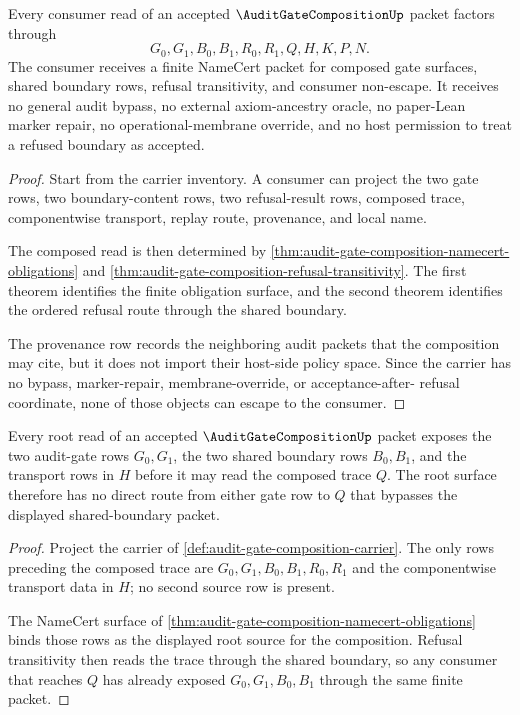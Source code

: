 \begin{theorem}
\label{thm:audit-gate-composition-consumer-nonescape}
Every consumer read of an accepted $\AuditGateCompositionUp$ packet factors
through
$$
G_0,G_1,B_0,B_1,R_0,R_1,Q,H,K,P,N.
$$
The consumer receives a finite NameCert packet for composed gate surfaces,
shared boundary rows, refusal transitivity, and consumer non-escape. It
receives no general audit bypass, no external axiom-ancestry oracle, no
paper-Lean marker repair, no operational-membrane override, and no host
permission to treat a refused boundary as accepted.
\end{theorem}
\begin{proof}
Start from the carrier inventory. A consumer can project the two gate rows,
two boundary-content rows, two refusal-result rows, composed trace,
componentwise transport, replay route, provenance, and local name.

The composed read is then determined by
\autoref{thm:audit-gate-composition-namecert-obligations} and
\autoref{thm:audit-gate-composition-refusal-transitivity}. The first theorem
identifies the finite obligation surface, and the second theorem identifies
the ordered refusal route through the shared boundary.

The provenance row records the neighboring audit packets that the composition
may cite, but it does not import their host-side policy space. Since the
carrier has no bypass, marker-repair, membrane-override, or acceptance-after-
refusal coordinate, none of those objects can escape to the consumer.
\end{proof}

\begin{theorem}
\label{thm:audit-gate-composition-root-source-boundary}
Every root read of an accepted $\AuditGateCompositionUp$ packet exposes the
two audit-gate rows $G_0,G_1$, the two shared boundary rows $B_0,B_1$, and
the transport rows in $H$ before it may read the composed trace $Q$. The
root surface therefore has no direct route from either gate row to $Q$ that
bypasses the displayed shared-boundary packet.
\end{theorem}
\begin{proof}
Project the carrier of \autoref{def:audit-gate-composition-carrier}. The
only rows preceding the composed trace are $G_0,G_1,B_0,B_1,R_0,R_1$ and
the componentwise transport data in $H$; no second source row is present.

The NameCert surface of
\autoref{thm:audit-gate-composition-namecert-obligations} binds those rows
as the displayed root source for the composition. Refusal transitivity then
reads the trace through the shared boundary, so any consumer that reaches
$Q$ has already exposed $G_0,G_1,B_0,B_1$ through the same finite packet.
\end{proof}


